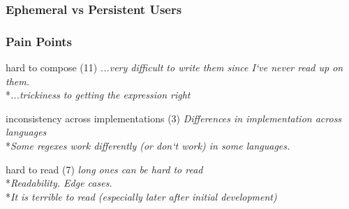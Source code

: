 

\begin{frame}
\frametitle{Ephemeral vs Persistent Users}


\end{frame}


\begin{frame}
\frametitle{Pain Points}
\begin{block}{hard to compose (11)}
\emph{...very difficult to write them since I`ve never read up on them.}
\\*\emph{...trickiness to getting the expression right}
\end{block}
\begin{block}{inconsistency across implementations (3)}
\emph{Differences in implementation across languages}
\\*\emph{Some regexes work differently (or don`t work) in some languages.}
\end{block}
\begin{block}{hard to read (7)}
\emph{long ones can be hard to read}
\\*\emph{Readability. Edge cases.}
\\*\emph{It is terrible to read (especially later after initial development) }
\end{block}
\end{frame}












